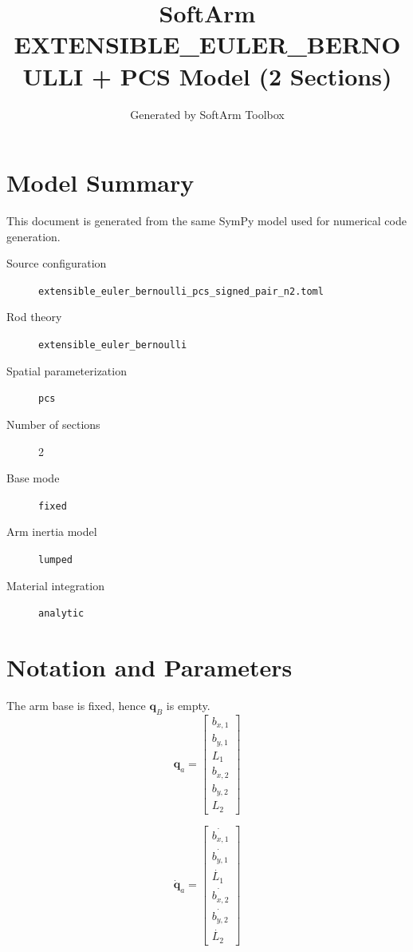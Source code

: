 \documentclass[11pt]{article}
\title{SoftArm EXTENSIBLE\_EULER\_BERNOULLI + PCS Model (2 Sections)}
\author{Generated by SoftArm Toolbox}
\date{}
\begin{document}
\maketitle

\section{Model Summary}
This document is generated from the same SymPy model used for numerical code generation.
\begin{description}
\item[Source configuration] \texttt{extensible\_euler\_bernoulli\_pcs\_signed\_pair\_n2.toml}
\item[Rod theory] \texttt{extensible\_euler\_bernoulli}
\item[Spatial parameterization] \texttt{pcs}
\item[Number of sections] 2
\item[Base mode] \texttt{fixed}
\item[Arm inertia model] \texttt{lumped}
\item[Material integration] \texttt{analytic}
\end{description}

\section{Notation and Parameters}
The arm base is fixed, hence $\boldsymbol q_B$ is empty.
\begin{equation}
\boldsymbol q_a=\begin{bmatrix}b_{x,1}\\b_{y,1}\\L_{1}\\b_{x,2}\\b_{y,2}\\L_{2}\end{bmatrix}
\end{equation}

\begin{equation}
\dot{\boldsymbol q}_a=\begin{bmatrix}\dot{b_{x,1}}\\\dot{b_{y,1}}\\\dot{L_{1}}\\\dot{b_{x,2}}\\\dot{b_{y,2}}\\\dot{L_{2}}\end{bmatrix}
\end{equation}
\end{document}

